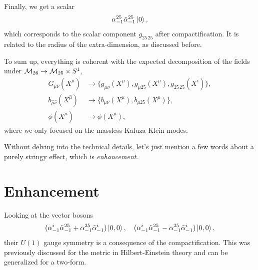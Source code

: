 Finally, we get a scalar
\begin{equation}\label{eq:comp-scalar}
    \alpha^{25}_{-1} \tilde{\alpha}^{25}_{-1} \ket{0},
\end{equation}
which corresponds to the scalar component $g_{25 \, 25}$ after compactification. It is related to the radius of the extra-dimension, as discussed before.

To sum up, everything is coherent with the expected decomposition of the fields under $\mathcal{M}_{26} \to \mathcal{M}_{25} \times S^1$,
\begin{equation}
\begin{aligned}
    G_{\hat{\mu}\hat{\nu}} (X^{\hat{\mu}}) &\to \{ g_{\mu\nu}(X^\mu), g_{\mu 25} (X^\mu), g_{25 \, 25}(X^i) \},\\
    b_{\hat{\mu}\hat{\nu}} (X^{\hat{\mu}}) &\to \{ b_{\mu\nu}(X^\mu), b_{\mu 25}(X^\mu) \},\\
    \phi (X^{\hat{\mu}}) &\to \phi(X^\mu),
\end{aligned}
\end{equation}
where we only focused on the massless Kaluza-Klein modes.

Without delving into the technical details, let's just mention a few words about a purely stringy effect, which is \emph{enhancement}.

\section{Enhancement}
Looking at the vector bosons
\begin{equation}
    (\alpha^{i}_{-1} \tilde{\alpha}^{25}_{-1}+ \alpha^{25}_{-1} \tilde{\alpha}^{i}_{-1}) \ket{0,0}, \quad (\alpha^{i}_{-1} \tilde{\alpha}^{25}_{-1} - \alpha^{25}_{-1} \tilde{\alpha}^{i}_{-1}) \ket{0,0},
\end{equation}
their $U(1)$ gauge symmetry is a consequence of the compactification. This was previously discussed for the metric in Hilbert-Einstein theory and can be generalized for a two-form. 

